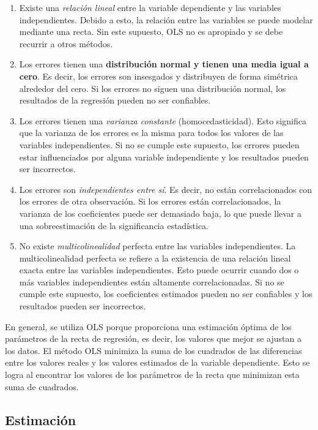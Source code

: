 \documentclass[
]{book}
\begin{document}
\begin{enumerate}
\def\labelenumi{\arabic{enumi}.}
\item
  Existe una \emph{relación lineal} entre la variable dependiente y las
  variables independientes. Debido a esto, la relación entre las
  variables se puede modelar mediante una recta. Sin este supuesto,
  OLS no es apropiado y se debe recurrir a otros métodos.
\item
  Los errores tienen una \textbf{distribución normal y tienen una media
  igual a cero}. Es decir, los errores son insesgados y distribuyen
  de forma simétrica alrededor del cero. Si los errores no siguen una
  distribución normal, los resultados de la regresión pueden no ser
  confiables.
\item
  Los errores tienen una \emph{varianza constante} (homocedasticidad). Esto
  significa que la varianza de los errores es la misma para todos los
  valores de las variables independientes. Si no se cumple este
  supuesto, los errores pueden estar influenciados por alguna variable
  independiente y los resultados pueden ser incorrectos.
\item
  Los errores son \emph{independientes entre sí}. Es decir, no están
  correlacionados con los errores de otra observación. Si los errores
  están correlacionados, la varianza de los coeficientes puede ser
  demasiado baja, lo que puede llevar a una sobreestimación de la
  significancia estadística.
\item
  No existe \emph{multicolinealidad} perfecta entre las variables
  independientes. La multicolinealidad perfecta se refiere a la
  existencia de una relación lineal exacta entre las variables
  independientes. Esto puede ocurrir cuando dos o más variables
  independientes están altamente correlacionadas. Si no se cumple este
  supuesto, los coeficientes estimados pueden no ser confiables y los
  resultados pueden ser incorrectos.
\end{enumerate}

En general, se utiliza OLS porque proporciona una estimación óptima de
los parámetros de la recta de regresión, es decir, los valores que mejor
se ajustan a los datos. El método OLS minimiza la suma de los cuadrados
de las diferencias entre los valores reales y los valores estimados de
la variable dependiente. Esto se logra al encontrar los valores de los
parámetros de la recta que minimizan esta suma de cuadrados.

\hypertarget{estimaciuxf3n-1}{%
\subsection{Estimación}\label{estimaciuxf3n-1}}
\end{document}
